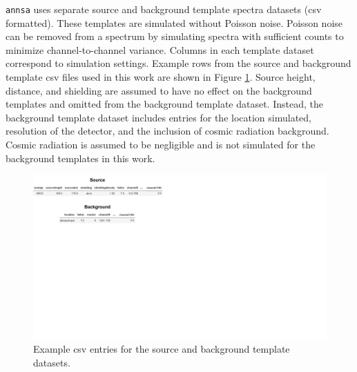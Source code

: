 \verb|annsa| uses separate source and background template spectra datasets (csv formatted). These templates are simulated without Poisson noise. Poisson noise can be removed from a spectrum by simulating spectra with sufficient counts to minimize channel-to-channel variance. Columns in each template dataset correspond to simulation settings. Example rows from the source and background template csv files used in this work are shown in Figure \ref{fig:template_csv}. Source height, distance, and shielding are assumed to have no effect on the background templates and omitted from the background template dataset. Instead, the background template dataset includes entries for the location simulated, resolution of the detector, and the inclusion of cosmic radiation background. Cosmic radiation is assumed to be negligible and is not simulated for the background templates in this work.

\begin{figure}[H]
	\centering
	\includegraphics[trim=0 380 490 0,clip,width=0.8\linewidth]{images/template_csv.png}
	\caption{Example csv entries for the source and background template datasets.}
	\label{fig:template_csv}
\end{figure}

